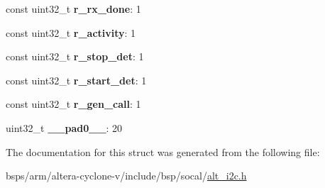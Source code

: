 \begin{DoxyCompactItemize}
const uint32\+\_\+t {\bfseries r\+\_\+rx\+\_\+done}\+: 1
\item 
\mbox{\label{structALT__I2C__INTR__STAT__s_a076653b6ef4420edbd9404469f23d997}} 
const uint32\+\_\+t {\bfseries r\+\_\+activity}\+: 1
\item 
\mbox{\label{structALT__I2C__INTR__STAT__s_ac7c8a04ab159a65a505d85799f812b02}} 
const uint32\+\_\+t {\bfseries r\+\_\+stop\+\_\+det}\+: 1
\item 
\mbox{\label{structALT__I2C__INTR__STAT__s_a80dfde88d0510880376f1e232cc515a4}} 
const uint32\+\_\+t {\bfseries r\+\_\+start\+\_\+det}\+: 1
\item 
\mbox{\label{structALT__I2C__INTR__STAT__s_a693dbd40e6abf859f7a3ae848e1db3bd}} 
const uint32\+\_\+t {\bfseries r\+\_\+gen\+\_\+call}\+: 1
\item 
\mbox{\label{structALT__I2C__INTR__STAT__s_a1429a69d8e8d72a7fef82f0f4273d54d}} 
uint32\+\_\+t {\bfseries \+\_\+\+\_\+pad0\+\_\+\+\_\+}\+: 20
\end{DoxyCompactItemize}


The documentation for this struct was generated from the following file\+:\begin{DoxyCompactItemize}
\item 
bsps/arm/altera-\/cyclone-\/v/include/bsp/socal/\mbox{\hyperlink{socal_2alt__i2c_8h}{alt\+\_\+i2c.\+h}}\end{DoxyCompactItemize}
